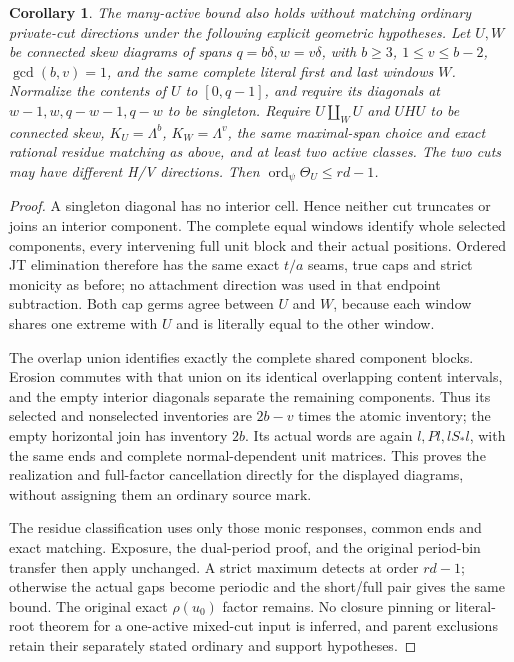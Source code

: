 \documentclass[11pt,a4paper]{amsart}
\numberwithin{equation}{section}
\theoremstyle{plain}
\newtheorem{corollary}[theorem]{Corollary}
\theoremstyle{definition}
\begin{document}
\begin{corollary}\label{cor:cut-independent-many-active}
The many-active bound also holds without matching ordinary private-cut directions under the following explicit geometric hypotheses.  Let \(U,W\) be connected skew diagrams of spans \(q=b\delta,w=v\delta\), with \(b\ge3\), \(1\le v\le b-2\), \(\gcd(b,v)=1\), and the same complete literal first and last windows \(W\).  Normalize the contents of \(U\) to \([0,q-1]\), and require its diagonals at \(w-1,w,q-w-1,q-w\) to be singleton.  Require \(U\amalg_WU\) and \(UHU\) to be connected skew, \(K_U=\Lambda^b\), \(K_W=\Lambda^v\), the same maximal-span choice and exact rational residue matching as above, and at least two active classes.  The two cuts may have different H/V directions.  Then \(\operatorname{ord}_\psi\Theta_U\le rd-1\).
\end{corollary}
\begin{proof}
A singleton diagonal has no interior cell.  Hence neither cut truncates or joins an interior component.  The complete equal windows identify whole selected components, every intervening full unit block and their actual positions.  Ordered JT elimination therefore has the same exact \(t/a\) seams, true caps and strict monicity as before; no attachment direction was used in that endpoint subtraction.  Both cap germs agree between \(U\) and \(W\), because each window shares one extreme with \(U\) and is literally equal to the other window.

The overlap union identifies exactly the complete shared component blocks.  Erosion commutes with that union on its identical overlapping content intervals, and the empty interior diagonals separate the remaining components.  Thus its selected and nonselected inventories are \(2b-v\) times the atomic inventory; the empty horizontal join has inventory \(2b\).  Its actual words are again \(l,Pl,lS_*l\), with the same ends and complete normal-dependent unit matrices.  This proves the realization and full-factor cancellation directly for the displayed diagrams, without assigning them an ordinary source mark.

The residue classification uses only those monic responses, common ends and exact matching.  Exposure, the dual-period proof, and the original period-bin transfer then apply unchanged.  A strict maximum detects at order \(rd-1\); otherwise the actual gaps become periodic and the short/full pair gives the same bound.  The original exact \(\rho(u_0)\) factor remains.  No closure pinning or literal-root theorem for a one-active mixed-cut input is inferred, and parent exclusions retain their separately stated ordinary and support hypotheses.
\end{proof}
\end{document}
